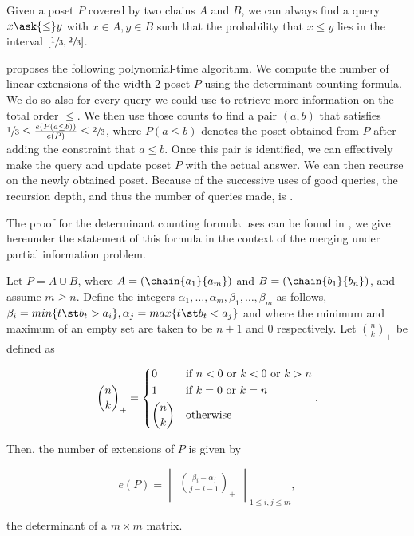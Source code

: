 \begin{theorem}
Given a poset \(P\) covered by two chains \(A\) and \(B\), we can always find
a query \(x \ask{\le} y\) with \(x \in A, y \in B\) such that the probability
that \(x \le y\) lies in the interval \([\sfrac{1}{3}, \sfrac{2}{3}]\).
\end{theorem}

\citet*{linial:1984} proposes the following polynomial-time algorithm. We
compute the number of linear extensions of the width-\(2\) poset \(P\) using
the determinant counting formula. We do so also for every query we could use to
retrieve more information on the total order \(\le\). We then use those counts
to find a pair \((a,b)\) that satisfies \(\sfrac{1}{3} \le \frac{e(P(a \le
b))}{e(P)} \le \sfrac{2}{3}\), where \(P(a \le b)\) denotes the poset obtained
from \(P\) after adding the constraint that \(a \le b\). Once this pair is
identified, we can effectively make the query and update poset \(P\) with the
actual answer.  We can then recurse on the newly obtained poset. Because of the
successive uses of good queries, the recursion depth, and thus the number of
queries made, is .

The proof for the determinant counting formula \citet*{linial:1984} uses can be
found in \citet*{mohanty:1979}, we give hereunder the statement of this formula
in the context of the merging under partial information problem.

\begin{theorem}
Let \(P = A \cup B\), where \(A = (\chain{a_1}{a_m})\) and \(B =
(\chain{b_1}{b_n})\), and assume \(m \ge n\). Define the integers
\(\alpha_1,\ldots,\alpha_m,\beta_1,\ldots,\beta_m\) as follows, \(\beta_i =
min\{t \st b_t > a_i\}, \alpha_j = max\{t \st b_t < a_j\}\) and where the
minimum and maximum of an empty set are taken to be \(n + 1\) and \(0\)
respectively. Let \(\binom{n}{k}_{+}\) be defined as

\begin{displaymath}
\binom{n}{k}_{+} =
\begin{dcases*}
0            & if  \(n < 0\)  or \(k < 0\)  or \(k > n\)\\
1            & if \(k = 0\)  or \(k = n\)\\
\binom{n}{k} & otherwise\\
\end{dcases*}.
\end{displaymath}

Then, the number of extensions of \(P\) is given by

\begin{displaymath}
e(P) =
\begin{vmatrix}
\binom{\beta_i - \alpha_j}{j - i - 1}_{+}
\end{vmatrix}_{1 \le i , j \le m},
\end{displaymath}

the determinant of a \(m \times m\) matrix.
\end{theorem}

